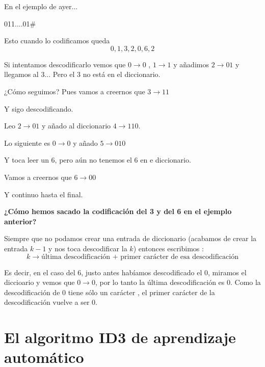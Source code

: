 \begin{example}
	En el ejemplo de ayer...
	
	011....01\#
	
	Esto cuando lo codificamos queda
	$$0,1,3,2,0,6,2$$
	
	Si intentamos descodificarlo vemos que $0 \rightarrow 0$ , $1 \rightarrow 1$ y añadimos $2 \rightarrow 01$ y llegamos al 3... Pero el 3 no está en el diccionario.
	
	¿Cómo seguimos? Pues vamos a creernos que $3 \rightarrow 11$
	
	Y sigo descodificando.
	
	Leo $2 \rightarrow 01$ y añado al diccionario $4 \rightarrow 110$.
	
	Lo siguiente es $0 \rightarrow 0$ y añado $5 \rightarrow 010$
	
	Y toca leer un 6, pero aún no tenemos el 6 en e diccionario.
	
	Vamos a creernos que $6 \rightarrow 00$
	
	Y continuo hasta el final.
\end{example}

\textbf{¿Cómo hemos sacado la codificación del 3 y del 6 en el ejemplo anterior?}

Siempre que no podamos crear una entrada de diccionario (acabamos de crear la entrada $k-1$ y nos toca descodificar la $k$) entonces escribimos : 
$$k \rightarrow \text{última descodificación + primer carácter de esa descodificación}$$

Es decir, en el caso del 6, justo antes habíamos descodificado el 0, miramos el diccioario y vemos que $0\rightarrow 0$, por lo tanto la última descodificación es 0. Como la descodificación de 0 tiene sólo un carácter , el primer carácter de la descodificación vuelve a ser 0.
\section{El algoritmo ID3 de aprendizaje automático}

